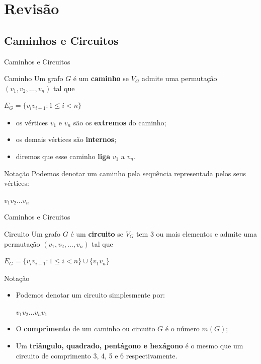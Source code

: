 \documentclass[xcolor=dvipsnames,table]{beamer}
\begin{document}
    \section{Revisão}
	\subsection{Caminhos e Circuitos}
	\begin{frame}[shrink]{Caminhos e Circuitos}
		\begin{block}{Caminho}
			Um grafo $G$ é um {\bf caminho} se $V_G$ admite uma permutação $(v_1, v_2, \ldots , v_n)$ tal que
			\begin{center}
				$E_G = \{ v_i v_{i +1} : 1 \leq i < n \}$
			\end{center} 
			\begin{itemize}
				\item os vértices $v_1$ e $v_n$ são os {\bf extremos} do caminho; 
				\item os demais vértices são {\bf internos}; 
				\item diremos que esse caminho {\bf liga} $v_1$ a $v_n$.
			\end{itemize}
		\end{block} 
		\begin{block}{Notação}
			Podemos denotar um caminho pela sequência representada pelos seus vértices: 
			\begin{center}
				$v_1 v_2 \ldots v_n$		
			\end{center}
		\end{block}
	\end{frame}
	
	\begin{frame}[shrink]{Caminhos e Circuitos}
		\begin{block}{Circuito}
			Um grafo $G$ é um {\bf circuito} se $V_G$ tem 3 ou mais elementos e admite uma permutação $(v_1, v_2, \ldots , v_n)$ tal que
			\begin{center}
				$E_G = \{ v_i v_{i +1} : 1 \leq i < n \} \cup \{ v_1 v_n \}$
			\end{center} 
		\end{block} 
		\begin{block}{Notação}
			\begin{itemize}
				\item Podemos denotar um circuito simplesmente por: 
					\begin{center}
						$v_1 v_2 \ldots v_n v_1$		
					\end{center}
				\item O {\bf comprimento} de um caminho ou circuito $G$ é o número $m(G)$; 
				\item Um {\bf triângulo, quadrado, pentágono {e} hexágono} é o mesmo que um circuito de comprimento 3, 4, 5 e 6 respectivamente.
			\end{itemize}
		\end{block}
	\end{frame}
	
\end{document}
